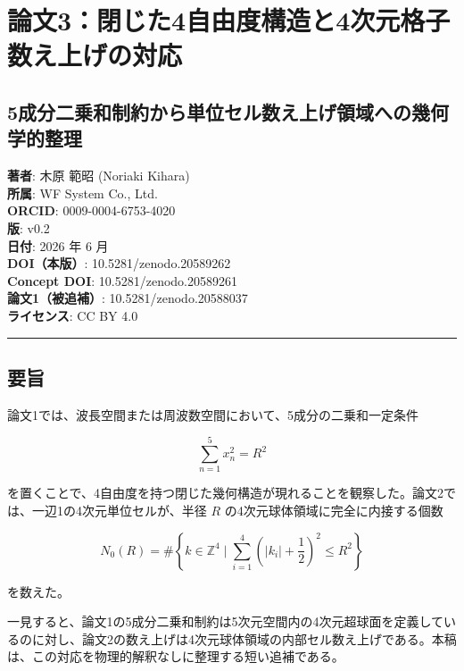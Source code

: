\documentclass[
]{ltjsarticle}
\author{}
\date{}
\begin{document}
\section{論文3：閉じた4自由度構造と4次元格子数え上げの対応}\label{ux8ad6ux65873ux9589ux3058ux305f4ux81eaux7531ux5ea6ux69cbux9020ux30684ux6b21ux5143ux683cux5b50ux6570ux3048ux4e0aux3052ux306eux5bfeux5fdc}

\subsection{5成分二乗和制約から単位セル数え上げ領域への幾何学的整理}\label{ux6210ux5206ux4e8cux4e57ux548cux5236ux7d04ux304bux3089ux5358ux4f4dux30bbux30ebux6570ux3048ux4e0aux3052ux9818ux57dfux3078ux306eux5e7eux4f55ux5b66ux7684ux6574ux7406}

\textbf{著者}: 木原 範昭 (Noriaki Kihara)\\
\textbf{所属}: WF System Co., Ltd.\\
\textbf{ORCID}: 0009-0004-6753-4020\\
\textbf{版}: v0.2\\
\textbf{日付}: 2026 年 6 月\\
\textbf{DOI（本版）}: 10.5281/zenodo.20589262\\
\textbf{Concept DOI}: 10.5281/zenodo.20589261\\
\textbf{論文1（被追補）}: 10.5281/zenodo.20588037\\
\textbf{ライセンス}: CC BY 4.0

\begin{center}\rule{0.5\linewidth}{0.5pt}\end{center}

\subsection{要旨}\label{ux8981ux65e8}

論文1では、波長空間または周波数空間において、5成分の二乗和一定条件

\[
\sum_{n=1}^{5}x_n^2=R^2
\]

を置くことで、4自由度を持つ閉じた幾何構造が現れることを観察した。論文2では、一辺1の4次元単位セルが、半径
\(R\) の4次元球体領域に完全に内接する個数

\[
N_0(R)
=
\#\left\{
k\in\mathbb{Z}^4
\mid
\sum_{i=1}^{4}
\left(|k_i|+\frac12\right)^2
\le R^2
\right\}
\]

を数えた。

一見すると、論文1の5成分二乗和制約は5次元空間内の4次元超球面を定義しているのに対し、論文2の数え上げは4次元球体領域の内部セル数え上げである。本稿は、この対応を物理的解釈なしに整理する短い追補である。
\end{document}
